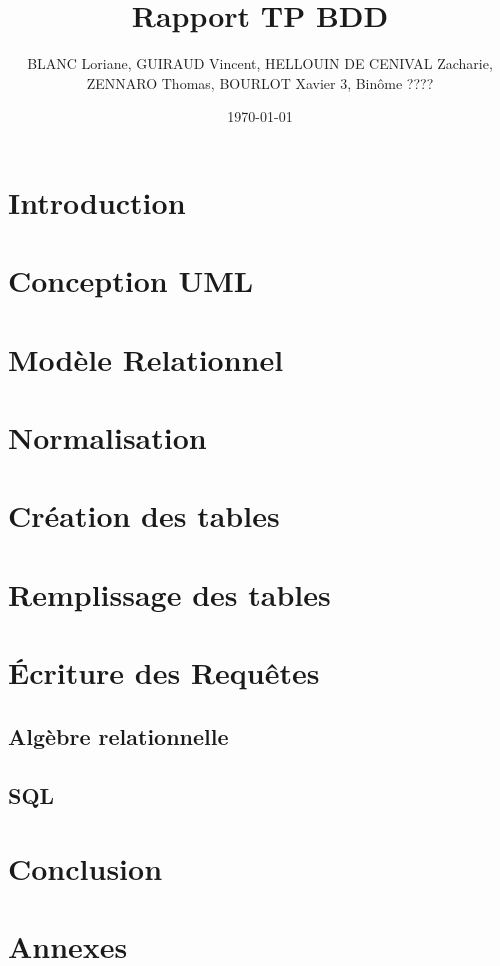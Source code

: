 \documentclass[french]{article}
\title{Rapport TP BDD}
\author{ BLANC Loriane, GUIRAUD Vincent, HELLOUIN DE CENIVAL Zacharie, ZENNARO Thomas, BOURLOT Xavier 3\bsc{Imacs-ae-c}, Binôme ????}
\date{\today}
\begin{document}
\maketitle
\tableofcontents

\newpage

\section{Introduction}
\section{Conception UML}
\section{Modèle Relationnel}
\section{Normalisation}
\section{Création des tables}
\section{Remplissage des tables}
\section{Écriture des Requêtes}
\subsection{Algèbre relationnelle}
\subsection{SQL}
\section{Conclusion}

\newpage
\appendix
\section{Annexes}
\end{document}
